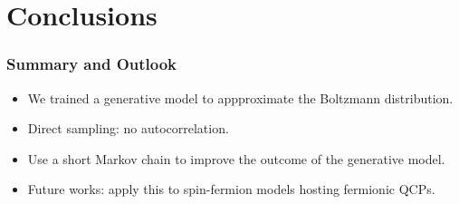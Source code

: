 \documentclass[xcolor=table, 10pt, aspectratio=169, ignorenonframetext]{beamer}
\begin{document}
\section{Conclusions}

\begin{frame}
  \frametitle{Summary and Outlook}
  \begin{itemize}
  \item We trained a generative model to appproximate the Boltzmann distribution.
  \item Direct sampling: no autocorrelation.
  \item Use a short Markov chain to improve the outcome of the generative model.
  \item Future works: apply this to spin-fermion models hosting fermionic QCPs.
  \end{itemize}
\end{frame}
\end{document}
